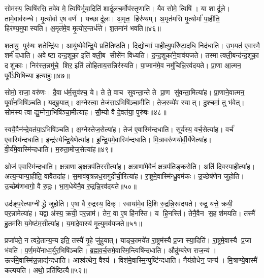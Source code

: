 सोम॑स्य॒ त्विषि॑रसि॒ तवे॑व मे॒ त्विषि॑र्भूया॒दिति॑ शार्दूलच॒र्मोप॑स्तृणाति। यैव सोमे॒ त्विषि॑। या शार्दू॒ले। तामे॒वाव॑रुन्धे। मृ॒त्योर्वा ए॒ष वर्ण॑। यच्छार्दू॒लः। अ॒मृत॒ हिर॑ण्यम्। अ॒मृत॑मसि मृ॒त्योर्मा॑ पा॒हीति॒ हिर॑ण्य॒मुपास्यति। अ॒मृत॑मे॒व मृ॒त्योर॒न्तर्ध॑त्ते। श॒तमा॑नं भवति॥४६॥

श॒तायु॒ पुरु॑षः श॒तेन्द्रि॑यः। आयु॑ष्ये॒वेन्द्रि॒ये प्रति॑तिष्ठति। दि॒द्योन्मा॑ पा॒हीत्यु॒परि॑ष्टा॒दधि॒ निद॑धाति। उ॒भ॒यत॑ ए॒वास्मै॒ शर्म॑ दधाति। अवेष्टा दन्द॒शूका॒ इति॑ क्ली॒ब सीसे॑न विध्यति। द॒न्द॒शूका॑ने॒वाव॑यजते। तस्मात्क्ली॒बन्द॑न्द॒शूका॒ दशु॑काः। निर॑स्त॒न्नमु॑चे॒ शिर॒ इति॑ लोहिताय॒सन्निर॑स्यति। पा॒प्मान॑मे॒व नमु॑चिन्नि॒रव॑दयते। प्रा॒णा आ॒त्मन॒ पूर्वे॑ऽभि॒षिच्या॒ इत्या॑हुः॥४७॥

सोमो॒ राजा॒ वरु॑णः। दै॒वा ध॑र्म॒सुव॑श्च॒ ये। ते ते॒ वाच सुवन्ता॒न्ते ते प्रा॒ण सु॑वन्ता॒मित्या॑ह। प्रा॒णाने॒वात्मन॒ पूर्वा॑न॒भिषि॑ञ्चति। यद्ब्रू॒यात्। अ॒ग्नेस्त्वा॒ तेज॑सा॒ऽभिषि॑ञ्चा॒मीति॑। ते॒ज॒स्व्ये॑व स्यात्। दु॒श्चर्मा॒ तु भ॑वेत्। सोम॑स्य त्वा द्यु॒म्नेना॒भिषि॑ञ्चा॒मीत्या॑ह। सौ॒म्यो वै दे॒वत॑या॒ पुरु॑षः॥४८॥

स्वयै॒वैन॑न्दे॒वत॑या॒ऽभिषि॑ञ्चति। अ॒ग्नेस्तेज॒सेत्या॑ह। तेज॑ ए॒वास्मि॑न्दधाति। सूर्य॑स्य॒ वर्च॒सेत्या॑ह। वर्च॑ ए॒वास्मि॑न्दधाति। इन्द्र॑स्येन्द्रि॒येणेत्या॑ह। इ॒न्द्रि॒यमे॒वास्मि॑न्दधाति। मि॒त्रावरु॑णयोर्वी॒र्ये॑णेत्या॑ह। वी॒र्य॑मे॒वास्मि॑न्दधाति। म॒रुता॒मोज॒सेत्या॑ह॥४९॥

ओज॑ ए॒वास्मि॑न्दधाति। क्ष॒त्राणाङ्क्ष॒त्रप॑तिर॒सीत्या॑ह। क्ष॒त्राणा॑मे॒वैनं॑ क्ष॒त्रप॑तिङ्करोति। अति॑ दि॒वस्पा॒हीत्या॑ह। अत्य॒न्यान्पा॒हीति॒ वावैतदा॑ह। स॒माव॑वृत्रन्नध॒रागुदी॑ची॒रित्या॑ह। रा॒ष्ट्रमे॒वास्मि॑न्ध्रु॒वम॑कः। उ॒च्छेष॑णेन जुहोति। उ॒च्छेष॑णभागो॒ वै रु॒द्रः। भा॒ग॒धेये॑नै॒व रु॒द्रन्नि॒रव॑दयते॥५०॥

उद॑ङ्प॒रेत्याग्नीद्ध्रे जुहोति। ए॒षा वै रु॒द्रस्य॒ दिक्। स्वाया॑मे॒व दि॒शि रु॒द्रन्नि॒रव॑दयते। रुद्र॒ यत्ते॒ क्रयी॒ पर॒न्नामेत्या॑ह। यद्वा अ॑स्य॒ क्रयी॒ पर॒न्नाम॑। तेन॒ वा ए॒ष हि॑नस्ति। य हि॒नस्ति॑। तेनै॒वैन स॒ह श॑मयति। तस्मै॑ हु॒तम॑सि य॒मेष्ट॑म॒सीत्या॑ह। य॒मादे॒वास्य॑ मृ॒त्युमव॑यजते॥५१॥

प्रजा॑पते॒ न त्वदे॒तान्य॒न्य इति॒ तस्यै॑ गृ॒हे जु॑हुयात्। याङ्का॒मये॑त रा॒ष्ट्रम॑स्यै प्र॒जा स्या॒दिति॑। रा॒ष्ट्रमे॒वास्यै प्र॒जा भ॑वति। प॒र्ण॒मये॑नाध्व॒र्युर॒भिषि॑ञ्चति। ब्र॒ह्म॒व॒र्च॒समे॒वास्मि॒न्त्विषि॑न्दधाति। औदु॑म्बरेण राज॒न्य॑। ऊर्ज॑मे॒वास्मि॑न्न॒न्नाद्य॑न्दधाति। आश्व॑त्थेन॒ वैश्य॑। विश॑मे॒वास्मि॒न्पुष्टि॑न्दधाति। नैय॑ग्रोधेन॒ जन्य॑। मि॒त्राण्ये॒वास्मै॑ कल्पयति। अथो॒ प्रति॑ष्ठित्यै॥५२॥

